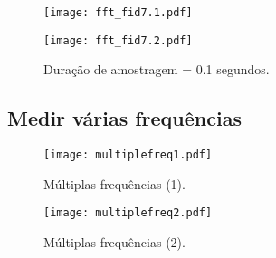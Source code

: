 \begin{figure}[!ht]
    \centering
    \begin{minipage}[b]{0.49\textwidth}
        \centering
        \texttt{[image: fft\_fid7.1.pdf]}
    \end{minipage}
    \hfill
    \begin{minipage}[b]{0.49\textwidth}
        \centering
        \texttt{[image: fft\_fid7.2.pdf]}
    \end{minipage}
    \caption{Duração de amostragem = 0.1 segundos.}
\end{figure}

\newpage

\subsection{Medir várias frequências}



\begin{figure}[!ht]
\centering
\texttt{[image: multiplefreq1.pdf]}
\caption{Múltiplas frequências (1).}
\end{figure}

\begin{figure}[!ht]
    \centering
    \texttt{[image: multiplefreq2.pdf]}
    \caption{Múltiplas frequências (2).}
\end{figure}